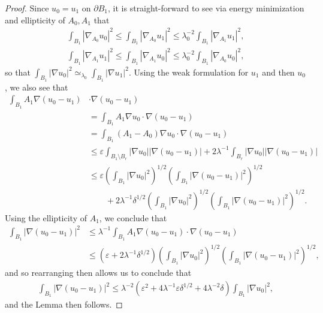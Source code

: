 \documentclass[12pt,leqno]{amsart}
\numberwithin{equation}{section}
\theoremstyle{definition}
\renewcommand{\epsilon}{\varepsilon}
\newcommand{\abs}[1]{\left \lvert #1 \right \rvert}
\begin{document}
	\begin{proof}
		Since $u_0 = u_1$ on $\partial B_1$, it is straight-forward to see via energy minimization and ellipticity of $A_0, A_1$ that
		\begin{align*}
			\int_{B_1} \abs{\nabla_{A_0} u_0}^2 \le \int_{B_1} \abs{\nabla_{A_0} u_1}^2 \le \lambda_0^{-2} \int_{B_1} \abs{\nabla_{A_1} u_1}^2, \\
			\int_{B_1} \abs{\nabla_{A_1} u_1}^2 \le \int_{B_1} \abs{\nabla_{A_1} u_0}^2 \le \lambda_0^{-2} \int_{B_1} \abs{\nabla_{A_0} u_0}^2,
		\end{align*}
		so that $\int_{B_1} \abs{\nabla u_0}^2 \simeq_{\lambda_0} \int_{B_1} \abs{\nabla u_1}^2$. Using the weak formulation for $u_1$ and then $u_0$, we also see that 
		\begin{align*}
			\int_{B_1} A_1 \nabla (u_0 - u_1) &  \cdot \nabla(u_0 - u_1) \\
			& =\int_{B_1} A_1 \nabla u_0 \cdot \nabla (u_0 - u_1)\\
			& = \int_{B_1} (A_1 - A_0) \nabla u_0 \cdot \nabla (u_0 - u_1) \\
			&  \le \epsilon \int_{B_1 \setminus B_r} \abs{\nabla u_0} \abs{ \nabla (u_0 - u_1)} + 2 \lambda^{-1} \int_{B_r} \abs{\nabla u_0} \abs{ \nabla (u_0 - u_1)} \\
			& \le \epsilon \left( \int_{B_1} \abs{\nabla u_0}^2 \right)^{1/2} \left( \int_{B_1 } \abs{\nabla (u_0 - u_1)}^2 \right)^{1/2} \\
			& \qquad + 2 \lambda^{-1} \delta^{1/2} \left( \int_{B_1} \abs{\nabla u_0}^2 \right)^{1/2} \left( \int_{B_1} \abs{\nabla (u_0 - u_1) }^2 \right)^{1/2}.
		\end{align*}
		Using the ellipticity of $A_1$, we conclude that
		\begin{align*}
			\int_{B_1} \abs{ \nabla (u_0 - u_1)}^2 & \le \lambda^{-1} \int_{B_1} A_1 \nabla (u_0 - u_1) \cdot \nabla (u_0 - u_1) \\
			&  \le (\epsilon + 2\lambda^{-1} \delta^{1/2}) \left( \int_{B_1} \abs{\nabla u_0}^2 \right)^{1/2} \left( \int_{B_1} \abs{\nabla (u_0 - u_1) }^2 \right)^{1/2},
		\end{align*}
		and so rearranging then allows us to conclude that 
		\begin{align*}
			\int_{B_1} \abs{\nabla (u_0 - u_1)}^2 \le \lambda^{-2} \left( \epsilon^2 + 4 \lambda^{-1} \epsilon \delta^{1/2} + 4 \lambda^{-2} \delta  \right) \int_{B_1} \abs{\nabla u_0}^2,
		\end{align*}
		and the Lemma then follows.
	\end{proof}

	
	
	


\end{document}
